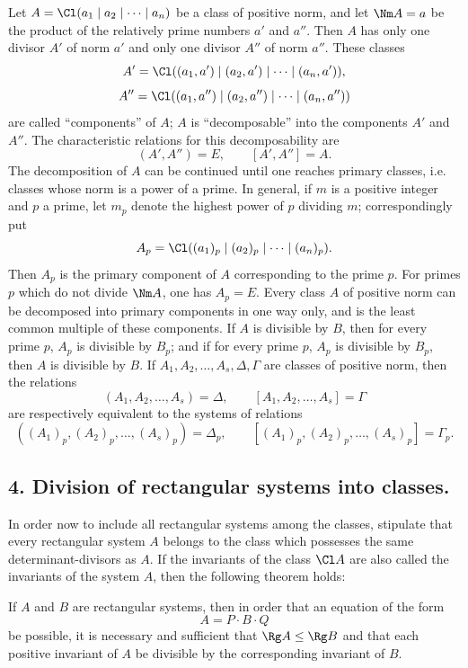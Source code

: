 Let $A=\Cl(a_1\mid a_2\mid\cdots\mid a_n)$ be a class of positive norm, and let $\Nm A=a$ be the product of the relatively prime numbers $a'$ and $a''$. Then $A$ has only one divisor $A'$ of norm $a'$ and only one divisor $A''$ of norm $a''$. These classes
\[
 A'=\Cl((a_1,a')\mid(a_2,a')\mid\cdots\mid(a_n,a')),
\]
\[
 A''=\Cl((a_1,a'')\mid(a_2,a'')\mid\cdots\mid(a_n,a''))
\]
are called ``components'' of $A$; $A$ is ``decomposable'' into the components $A'$ and $A''$. The characteristic relations for this decomposability are
\[
 (A',A'')=E,
 \qquad [A',A'']=A.
\]
The decomposition of $A$ can be continued until one reaches primary classes, i.e. classes whose norm is a power of a prime. In general, if $m$ is a positive integer and $p$ a prime, let $m_p$ denote the highest power of $p$ dividing $m$; correspondingly put
\[
 A_p=\Cl((a_1)_p\mid(a_2)_p\mid\cdots\mid(a_n)_p).
\]
Then $A_p$ is the primary component of $A$ corresponding to the prime $p$. For primes $p$ which do not divide $\Nm A$, one has $A_p=E$. Every class $A$ of positive norm can be decomposed into primary components in one way only, and is the least common multiple of these components. If $A$ is divisible by $B$, then for every prime $p$, $A_p$ is divisible by $B_p$; and if for every prime $p$, $A_p$ is divisible by $B_p$, then $A$ is divisible by $B$. If $A_1,A_2,\ldots,A_s,\Delta,\Gamma$ are classes of positive norm, then the relations
\[
 (A_1,A_2,\ldots,A_s)=\Delta,
 \qquad [A_1,A_2,\ldots,A_s]=\Gamma
\]
are respectively equivalent to the systems of relations
\[
 ((A_1)_p,(A_2)_p,\ldots,(A_s)_p)=\Delta_p,
 \qquad [(A_1)_p,(A_2)_p,\ldots,(A_s)_p]=\Gamma_p.
\]

\subsection*{4. Division of rectangular systems into classes.}

In order now to include all rectangular systems among the classes, stipulate that every rectangular system $A$ belongs to the class which possesses the same determinant-divisors as $A$. If the invariants of the class $\Cl A$ are also called the invariants of the system $A$, then the following theorem holds:

If $A$ and $B$ are rectangular systems, then in order that an equation of the form
\[
 A=P\cdot B\cdot Q
\]
be possible, it is necessary and sufficient that $\Rg A\le\Rg B$ and that each positive invariant of $A$ be divisible by the corresponding invariant of $B$.

